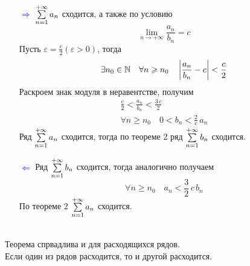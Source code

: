 \begin{Proof}~
    \begin{enumerate}
        \item[\textcolor{blue}{$\Rightarrow$}] $\sum\limits_{n = 1}^{+\infty}{a_n}$ сходится, а также по условию
        \[
            \lim_{n \to +\infty} \frac{a_n}{b_n} = c
        \]
        Пусть $\varepsilon = \frac{c}{2} (\varepsilon > 0)$, тогда 
        \begin{gather*}
             \exists n_0 \in \mathbb{N} \quad \forall n \geqslant n_0 \quad \left|\frac{a_n}{b_n} - c\right| < \frac{c}{2} 
        \end{gather*}
        Раскроем знак модуля в неравентстве, получим
        \begin{gather*}
            \frac{c}{2} < \frac{a_n}{b_n} < \frac{3\,c}{2}\\
            \forall n \geqslant n_0 \quad 0 < b_n < \frac{2}{c}\,a_n
        \end{gather*}
        Ряд $\sum\limits_{n = 1}^{+\infty}{a_n}$ сходится, тогда по теореме 2 ряд $\sum\limits_{n = 1}^{+\infty}{b_n}$ сходится.\\
        
        \item[\textcolor{blue}{$\Leftarrow$}] Ряд $\sum\limits_{n = 1}^{+\infty}{b_n}$ сходится, тогда аналогично получаем
        \[
            \forall n \geq n_0 \quad a_n < \frac{3}{2}\,c\,b_n
        \]
        По теореме 2 $\sum\limits_{n = 1}^{+\infty}{a_n}$ сходится.
    \end{enumerate}
\end{Proof}

\begin{Note}~\\
    Теорема спрвадлива и для расходящихся рядов.\\
    Если один из рядов расходится, то и другой расходится.
\end{Note}


